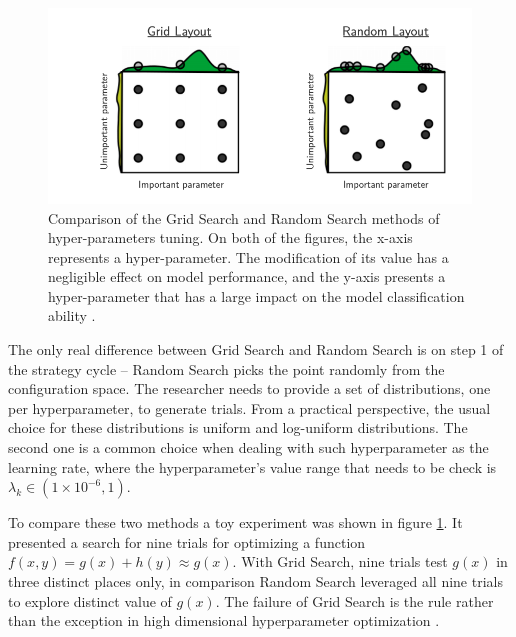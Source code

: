 \begin{figure}
\centering
\includegraphics{figures/GridSearch.png}
\caption{Comparison of the Grid Search and Random Search methods of hyper-parameters tuning. 
On both of the figures, the x-axis represents a hyper-parameter. The modification of its value has a negligible effect on model performance, and the y-axis presents a hyper-parameter that has a large impact on the model classification ability \cite{RandomSearch}. 
\label{fig:GridSearch}}
\end{figure} 

The only real difference between Grid Search and Random Search is on step 1 of the strategy cycle – Random Search picks the point randomly from the configuration space. 
The researcher needs to provide a set of distributions, one per hyperparameter, to generate trials. From a practical perspective, the usual choice for these distributions is uniform and log-uniform distributions. The second one is a common choice when dealing with such hyperparameter as the learning rate, where the hyperparameter's value range that needs to be check is   $ \lambda_k \in (1\times 10^{-6},1)$. 


To compare these two methods a toy experiment was shown in figure \ref{fig:GridSearch}. It presented a search for nine trials for optimizing a function \\ $f(x,y) = g(x) + h(y) \approx g(x)$. With Grid Search, nine trials test $g(x)$ in three distinct places only, in comparison Random Search leveraged all nine trials to explore distinct value of $g(x)$. The failure of Grid Search is the rule rather than the exception in high dimensional hyperparameter optimization \cite{RandomSearch}. 
 


